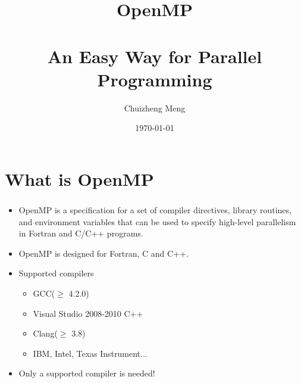 \documentclass{beamer}
\title{OpenMP\\\ \\
	An Easy Way for Parallel Programming
	}
\author{Chuizheng Meng}
\date{\today}
\begin{document}
	\begin{frame}
		\titlepage
	\end{frame}
	
	\section{What is OpenMP}
	\begin{frame}
		\frametitle{\insertsection}
		\begin{itemize}
			\item OpenMP is a specification for a set of compiler directives, library routines, and environment variables that can be used to specify high-level parallelism in Fortran and C/C++ programs.
			\item OpenMP is designed for Fortran, C and C++.
			\item Supported compilers
			\begin{itemize}
				\item GCC($\geqslant$ 4.2.0)
				\item Visual Studio 2008-2010 C++
				\item Clang($\geqslant$ 3.8)
				\item IBM, Intel, Texas Instrument...
			\end{itemize}
			\item Only a supported compiler is needed!
		\end{itemize}
	\end{frame}
	
\end{document}
